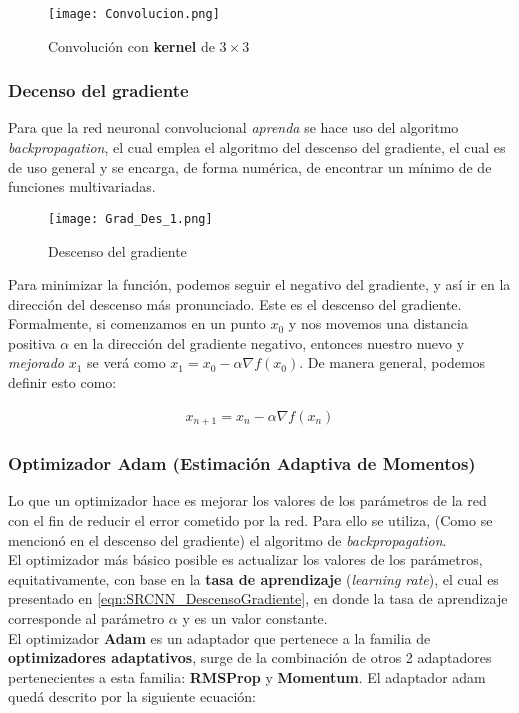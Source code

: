 \begin{figure}[H]
    \label{fig:SRCNN_Convolucion}
    \centering
    \texttt{[image: Convolucion.png]}
    \caption{Convolución con \textbf{kernel} de $3\times 3$}
\end{figure}

\subsubsection{Decenso del gradiente}
Para que la red neuronal convolucional \emph{aprenda} se hace uso del algoritmo \emph{backpropagation}, el cual emplea el
algoritmo del descenso del gradiente, el cual es de uso general y se encarga, de forma numérica, de encontrar un mínimo de
de funciones multivariadas.\\

\begin{figure}[H]
    \label{fig:SRCNN_GradDescent}
    \centering
    \texttt{[image: Grad\_Des\_1.png]}
    \caption{Descenso del gradiente}
\end{figure}

Para minimizar la función, podemos seguir el negativo del gradiente, y así ir en la dirección del descenso más pronunciado.
Este es el descenso del gradiente. Formalmente, si comenzamos en un punto $x_0$ y nos movemos una distancia positiva $\alpha$
en la dirección del gradiente negativo, entonces nuestro nuevo y \emph{mejorado} $x_1$ se verá como $x_1=x_0-\alpha\nabla f(x_0)$.
De manera general, podemos definir esto como:

\begin{align}
    \label{eqn:SRCNN_DescensoGradiente}
    x_{n+1}=x_n-\alpha\nabla f(x_n)
\end{align}

\subsubsection{Optimizador Adam (Estimación Adaptiva de Momentos)}
Lo que un optimizador hace es mejorar los valores de los parámetros de la red con el fin de reducir el error cometido por la red.
Para ello se utiliza, (Como se mencionó en el descenso del gradiente) el algoritmo de \emph{backpropagation}.\\
El optimizador más básico posible es actualizar los valores de los parámetros, equitativamente, con base en la \textbf{tasa de
aprendizaje} (\emph{learning rate}), el cual es presentado en \eqref{eqn:SRCNN_DescensoGradiente}, en donde la tasa de aprendizaje
corresponde al parámetro \textbf{$\alpha$} y es un valor constante.\\
El optimizador \textbf{Adam} es un adaptador que pertenece a la familia de \textbf{optimizadores adaptativos}, surge de la
combinación de otros 2 adaptadores pertenecientes a esta familia: \textbf{RMSProp} y \textbf{Momentum}.
El adaptador adam quedá descrito por la siguiente ecuación:

